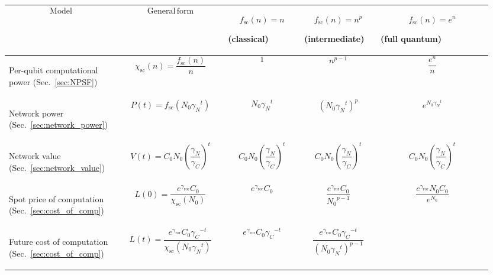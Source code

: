 \begin{table}[!htbp]
{\footnotesize
\begin{tabular}{|m{0.21\linewidth}|m{0.21\linewidth}|m{0.15\linewidth}|m{0.155\linewidth}|m{0.225\linewidth}|}
	\hline
	\[\mathrm{Model}\] & \[\mathrm{General\, form}\] & \[f_\mathrm{sc}(n)=n\] \begin{center}(classical)\end{center} & \[f_\mathrm{sc}(n)=n^p\] \begin{center}(intermediate)\end{center} & \[f_\mathrm{sc}(n)=e^n\] \begin{center}(full quantum)\end{center}\\
	\hline \hline
	\begin{flushleft}Per-qubit computational power (Sec.~\ref{sec:NPSF})\end{flushleft} & \[\chi_\mathrm{sc}(n)=\frac{f_\mathrm{sc}(n)}{n}\] & \[1\] & \[n^{p-1}\] & \[\frac{e^n}{n}\]\\
	\hline
	\begin{flushleft}Network power (Sec.~\ref{sec:network_power})\end{flushleft} & \[P(t)=f_\mathrm{sc}(N_0{\gamma_N}^t)\] & \[N_0{\gamma_N}^t\] & \[\left(N_0{\gamma_N}^t\right)^p\] & \[ e^{N_0{\gamma_N}^t}\] \\
	\hline
	\begin{flushleft}Network value (Sec.~\ref{sec:network_value})\end{flushleft} & \[V(t)=C_0 N_0 \left(\frac{\gamma_N}{\gamma_C}\right)^t\] & \[C_0 N_0 \left(\frac{\gamma_N}{\gamma_C}\right)^t\] & \[C_0 N_0 \left(\frac{\gamma_N}{\gamma_C}\right)^t\] & \[C_0 N_0 \left(\frac{\gamma_N}{\gamma_C}\right)^t\] \\
	\hline
	\begin{flushleft}Spot price of computation (Sec.~\ref{sec:cost_of_comp})\end{flushleft} & \[L(0)=\frac{e^{\gamma_\mathrm{ror}} C_0}{\chi_\mathrm{sc}(N_0)}\] & \[e^{\gamma_\mathrm{ror}} C_0\] &  \[\frac{e^{\gamma_\mathrm{ror}}C_0}{{N_0}^{p-1}}\] & \[\frac{e^{\gamma_\mathrm{ror}}N_0C_0}{e^{N_0}}\] \\
	\hline
	\begin{flushleft}Future cost of computation (Sec.~\ref{sec:cost_of_comp})\end{flushleft} & \[L(t)=\frac{e^{\gamma_\mathrm{ror}} C_0{\gamma_C}^{-t}}{\chi_\mathrm{sc}(N_0 {\gamma_N}^t)}
\] & \[e^{\gamma_\mathrm{ror}} C_0{\gamma_C}^{-t} \] & \[ \frac{e^{\gamma_\mathrm{ror}} C_0{\gamma_C}^{-t}}{(N_0 {\gamma_N}^t)^{p-1}}
\]
\end{tabular}}
\end{table}
